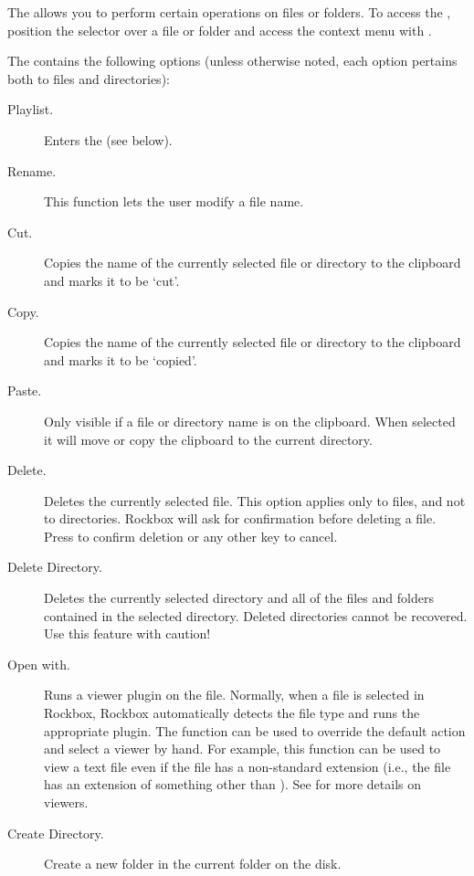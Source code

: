 The  allows you to perform certain operations on files or 
folders.  To access the , position the selector over a file 
or folder and access the context menu with \ActionStdContext{}.


The  contains the following options (unless otherwise noted, 
each option pertains both to files and directories):

\begin{description}
\item [Playlist.]
  Enters the  (see below).
\item [Rename.]
  This function lets the user modify a file name.
\item [Cut.]
  Copies the name of the currently selected file or directory to the clipboard
  and marks it to be `cut'.
\item [Copy.]
  Copies the name of the currently selected file or directory to the clipboard
  and marks it to be `copied'.
\item [Paste.]
  Only visible if a file or directory name is on the clipboard. When selected
  it will move or copy the clipboard to the current directory.
\item [Delete.]
  Deletes the currently selected file. This option applies only to files, and
  not to directories. Rockbox will ask for confirmation before deleting a file.
  Press \ActionYesNoAccept{}
  to confirm deletion or any other key to cancel.
\item [Delete Directory.]
  Deletes the currently selected directory and all of the files and folders
  contained in the selected directory.  Deleted directories cannot be recovered.
  Use this feature with caution!
\item [Open with.]
  Runs a viewer plugin on the file. Normally, when a file is selected in Rockbox,
  Rockbox automatically detects the file type and runs the appropriate plugin.
  The  function can be used to override the default action and
  select a viewer by hand.
  For example, this function can be used to view a text file
  even if the file has a non-standard extension (i.e., the file has an extension
  of something other than ).  See 
  for more details on viewers.
\item [Create Directory.]
  Create a new folder in the current folder on the disk.
\end{description}

